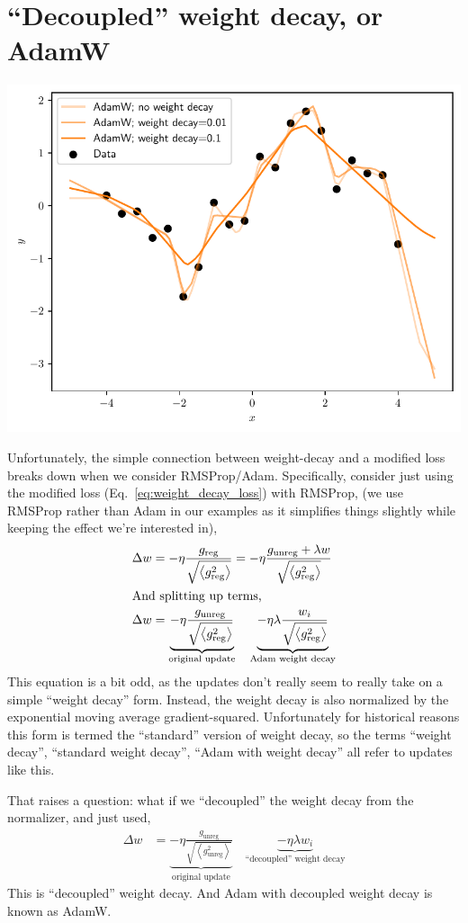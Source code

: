 \documentclass{article}
\newcommand{\bracket}[3]{\left#1 #3 \right#2}
\newcommand{\ab}{\bracket{\langle}{\rangle}}
\newcommand{\0}{\mathbf{0}}
\newcommand{\greg}{g_\text{reg}}
\newcommand{\gunreg}{g_\text{unreg}}
\begin{document}
\newpage
\section{``Decoupled'' weight decay, or AdamW}
\includegraphics[width=\textwidth]{decoupled_weight_decay.pdf}

Unfortunately, the simple connection between weight-decay and a modified loss breaks down when we consider RMSProp/Adam.
Specifically, consider just using the modified loss (Eq.~\ref{eq:weight_decay_loss}) with RMSProp, (we use RMSProp rather than Adam in our examples as it simplifies things slightly while keeping the effect we're interested in),
\begin{align}
  \label{eq:adamL2}
  \Delta w &= -\eta \frac{\greg}{\sqrt{\ab{\greg^2}}} = -\eta \frac{\gunreg + \lambda w}{\sqrt{\ab{\greg^2}}}\\
  \intertext{And splitting up terms,}
  \Delta w &= \underbrace{-\eta \frac{\gunreg}{\sqrt{\ab{\greg^2}}}}_\text{original update} \quad\underbrace{- \eta \lambda \frac{w_i}{\sqrt{\ab{\greg^2}}}}_\text{Adam weight decay}
\end{align}
This equation is a bit odd, as the updates don't really seem to really take on a simple ``weight decay'' form.
Instead, the weight decay is also normalized by the exponential moving average gradient-squared.
Unfortunately for historical reasons this form is termed the ``standard'' version of weight decay, so the terms ``weight decay'', ``standard weight decay'', ``Adam with weight decay'' all refer to updates like this.

That raises a question: what if we ``decoupled'' the weight decay from the normalizer, and just used,
\begin{align}
  \label{eq:adamw}
  \Delta w &= \underbrace{-\eta \frac{\gunreg}{\sqrt{\ab{\gunreg^2}}}}_\text{original update} \quad \underbrace{- \eta \lambda w_i}_\text{``decoupled'' weight decay}
\end{align}
This is ``decoupled'' weight decay.  And Adam with decoupled weight decay is known as AdamW.
\end{document}
